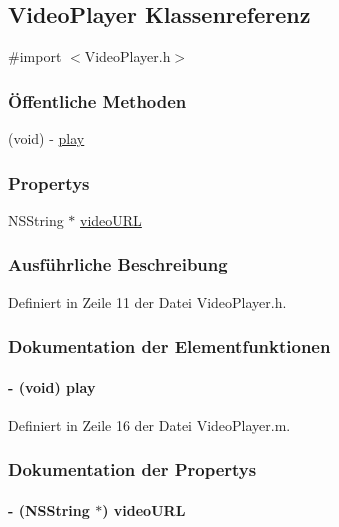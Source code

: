 \hypertarget{interface_video_player}{
\subsection{VideoPlayer Klassenreferenz}
\label{interface_video_player}
}


{\ttfamily \#import $<$VideoPlayer.h$>$}\subsubsection*{Öffentliche Methoden}
\begin{DoxyCompactItemize}
\item 
(void) -\/ \hyperlink{interface_video_player_a13ba0d270e849566f33ceffd7fb425c0}{play}
\end{DoxyCompactItemize}
\subsubsection*{Propertys}
\begin{DoxyCompactItemize}
\item 
NSString $\ast$ \hyperlink{interface_video_player_ad8bfac38e10fa8a994f0bbe732a2599a}{videoURL}
\end{DoxyCompactItemize}


\subsubsection{Ausführliche Beschreibung}


Definiert in Zeile 11 der Datei VideoPlayer.h.

\subsubsection{Dokumentation der Elementfunktionen}
\hypertarget{interface_video_player_a13ba0d270e849566f33ceffd7fb425c0}{
\paragraph[{play}]{\setlength{\rightskip}{0pt plus 5cm}-\/ (void) play }\hfill}
\label{interface_video_player_a13ba0d270e849566f33ceffd7fb425c0}


Definiert in Zeile 16 der Datei VideoPlayer.m.

\subsubsection{Dokumentation der Propertys}
\hypertarget{interface_video_player_ad8bfac38e10fa8a994f0bbe732a2599a}{
\paragraph[{videoURL}]{\setlength{\rightskip}{0pt plus 5cm}-\/ (NSString $\ast$) videoURL}\hfill}
\label{interface_video_player_ad8bfac38e10fa8a994f0bbe732a2599a}


